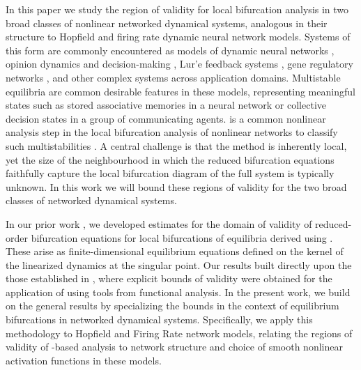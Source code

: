 \documentclass[letterpaper, 10 pt, conference]{ieeeconf}
\begin{document}
In this paper we study the region of validity for local bifurcation analysis in two broad classes of nonlinear networked dynamical systems, analogous in their structure to Hopfield and firing rate dynamic neural network models. Systems of this form are commonly encountered as models of dynamic neural networks \cite{hopfield1984neurons,betteti2025input,wilson1972excitatory,betteti2025firing}, opinion dynamics and decision-making \cite{franci2015realization,bizyaeva2023nonlinear,gray2018multiagent,fontan2017multiequilibria,abara2017spectral,leonard2024fast}, Lur'e feedback systems \cite{tang2017finite,liu2018bipartite,miranda2018analysis}, gene regulatory networks \cite{goodwin1965oscillatory,rosenfeld2002negative,gardner2000construction}, and other complex systems across application domains. Multistable equilibria are common desirable features in these models, representing meaningful states such as stored associative memories in a neural network or collective decision states in a group of communicating agents.
\LSR{} is a common nonlinear analysis step in the local bifurcation analysis of nonlinear networks to classify such multistabilities \cite{golubitsky2023dynamics,leonard2024fast}. A central challenge is that the method is inherently local, yet the size of the neighbourhood in which the reduced bifurcation equations faithfully capture the local bifurcation diagram of the full system is typically unknown. In this work we will bound these regions of validity for the two broad classes of networked dynamical systems.


In our prior work \cite{gupta2024estimates}, we developed estimates for the domain of validity of reduced-order bifurcation equations for local bifurcations of equilibria derived using \LSR{}. These arise as finite-dimensional equilibrium equations defined on the kernel of the linearized dynamics at the singular point. Our results built directly upon the those established in \cite{jindal2024estimates}, where explicit bounds of validity were obtained for the application of \ImFT{} using tools from functional analysis. In the present work, we build on the general results by specializing the bounds in the context of equilibrium bifurcations in networked dynamical systems. Specifically, we apply this methodology to Hopfield and Firing Rate network models, relating the regions of validity of \LSR{}-based analysis to network structure and choice of smooth nonlinear activation functions in these models.
\end{document}

